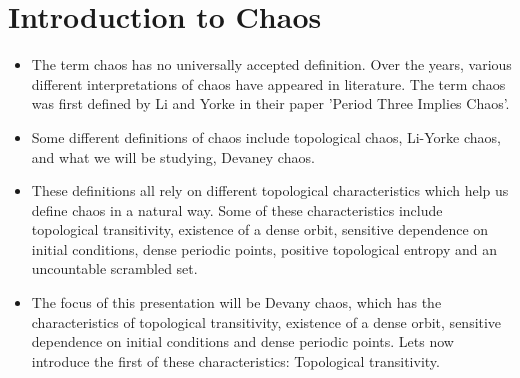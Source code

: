 \documentclass{article}
\begin{document}
    \section{Introduction to Chaos}
    \begin{itemize}
        \item The term chaos has no universally accepted definition. Over the years, various different interpretations of chaos have appeared in literature. The term chaos was first defined by Li and Yorke in their paper 'Period Three Implies Chaos'.
        \item Some different definitions of chaos include topological chaos, Li-Yorke chaos, and what we will be studying, Devaney chaos.
        \item These definitions all rely on different topological characteristics which help us define chaos in a natural way. Some of these characteristics include topological transitivity, existence of a dense orbit, sensitive dependence on initial conditions, dense periodic points, positive topological entropy and an uncountable scrambled set.
        \item The focus of this presentation will be Devany chaos, which has the characteristics of topological transitivity, existence of a dense orbit, sensitive dependence on initial conditions and dense periodic points. Lets now introduce the first of these characteristics: Topological transitivity.
    \end{itemize}
\end{document}
